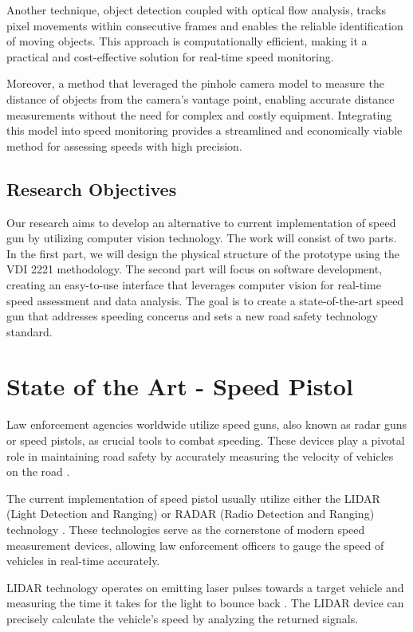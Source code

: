 Another technique, object detection coupled with optical flow analysis, tracks pixel movements within consecutive frames and enables the reliable identification of moving objects. This approach is computationally efficient, making it a practical and cost-effective solution for real-time speed monitoring.

Moreover, a method that leveraged the pinhole camera model to measure the distance of objects from the camera's vantage point, enabling accurate distance measurements without the need for complex and costly equipment. Integrating this model into speed monitoring provides a streamlined and economically viable method for assessing speeds with high precision.

\section{Research Objectives}
Our research aims to develop an alternative to current implementation of speed gun by utilizing computer vision technology. The work will consist of two parts. In the first part, we will design the physical structure of the prototype using the VDI 2221 methodology. The second part will focus on software development, creating an easy-to-use interface that leverages computer vision for real-time speed assessment and data analysis. The goal is to create a state-of-the-art speed gun that addresses speeding concerns and sets a new road safety technology standard.

\chapter{State of the Art - Speed Pistol}
\label{chap:stateoftheart}
Law enforcement agencies worldwide utilize speed guns, also known as radar guns or speed pistols, as crucial tools to combat speeding. These devices play a pivotal role in maintaining road safety by accurately measuring the velocity of vehicles on the road \cite{Hull_2020}.

The current implementation of speed pistol usually utilize either the LIDAR (Light Detection and Ranging) or RADAR (Radio Detection and Ranging) technology \cite{StalkerRadar_2023} \cite{FlyGuys_2023} \cite{Kustom23} \cite{LaserTech_2023}. These technologies serve as the cornerstone of modern speed measurement devices, allowing law enforcement officers to gauge the speed of vehicles in real-time accurately.

LIDAR technology operates on emitting laser pulses towards a target vehicle and measuring the time it takes for the light to bounce back \cite{FlyGuys_2023}. The LIDAR device can precisely calculate the vehicle's speed by analyzing the returned signals.

